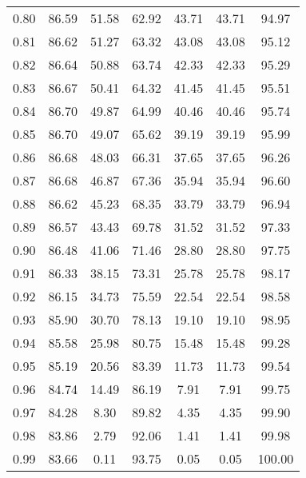 \begin{tabular}{|c|c|c|c|c|c|c|}
      0.80 &     86.59 &     51.58 &      62.92 &   43.71 &      43.71 &         94.97 \\
      0.81 &     86.62 &     51.27 &      63.32 &   43.08 &      43.08 &         95.12 \\
      0.82 &     86.64 &     50.88 &      63.74 &   42.33 &      42.33 &         95.29 \\
      0.83 &     86.67 &     50.41 &      64.32 &   41.45 &      41.45 &         95.51 \\
      0.84 &     86.70 &     49.87 &      64.99 &   40.46 &      40.46 &         95.74 \\
      0.85 &     86.70 &     49.07 &      65.62 &   39.19 &      39.19 &         95.99 \\
      0.86 &     86.68 &     48.03 &      66.31 &   37.65 &      37.65 &         96.26 \\
      0.87 &     86.68 &     46.87 &      67.36 &   35.94 &      35.94 &         96.60 \\
      0.88 &     86.62 &     45.23 &      68.35 &   33.79 &      33.79 &         96.94 \\
      0.89 &     86.57 &     43.43 &      69.78 &   31.52 &      31.52 &         97.33 \\
      0.90 &     86.48 &     41.06 &      71.46 &   28.80 &      28.80 &         97.75 \\
      0.91 &     86.33 &     38.15 &      73.31 &   25.78 &      25.78 &         98.17 \\
      0.92 &     86.15 &     34.73 &      75.59 &   22.54 &      22.54 &         98.58 \\
      0.93 &     85.90 &     30.70 &      78.13 &   19.10 &      19.10 &         98.95 \\
      0.94 &     85.58 &     25.98 &      80.75 &   15.48 &      15.48 &         99.28 \\
      0.95 &     85.19 &     20.56 &      83.39 &   11.73 &      11.73 &         99.54 \\
      0.96 &     84.74 &     14.49 &      86.19 &    7.91 &       7.91 &         99.75 \\
      0.97 &     84.28 &      8.30 &      89.82 &    4.35 &       4.35 &         99.90 \\
      0.98 &     83.86 &      2.79 &      92.06 &    1.41 &       1.41 &         99.98 \\
      0.99 &     83.66 &      0.11 &      93.75 &    0.05 &       0.05 &        100.00 \\
\bottomrule
\end{tabular}
